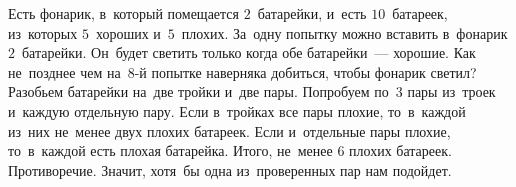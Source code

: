\problem
Есть фонарик, в~который помещается $2$~батарейки, и~есть $10$~батареек,
из~которых $5$~хороших и~$5$~плохих.
За~одну попытку можно вставить в~фонарик $2$~батарейки.
Он~будет светить только когда обе батарейки~--- хорошие.
Как не~позднее чем на~$8$-й попытке наверняка добиться, чтобы фонарик светил?
\solution
Разобьем батарейки на~две тройки и~две пары.
Попробуем по~3 пары из~троек и~каждую отдельную пару.
Если в~тройках все пары плохие, то~в~каждой из~них не~менее двух плохих
батареек.
Если и~отдельные пары плохие, то~в~каждой есть плохая батарейка.
Итого, не~менее 6 плохих батареек.
Противоречие.
Значит, хотя~бы одна из~проверенных пар нам подойдет.
\endproblem
